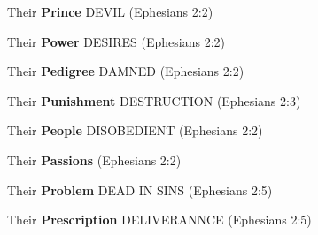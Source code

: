 \begin{compactenum}[I.][8]
    \item Their \textbf{Prince} DEVIL  (Ephesians 2:2)
    \item Their \textbf{Power} DESIRES  (Ephesians 2:2)
    \item Their \textbf{Pedigree} DAMNED (Ephesians 2:2)
    \item Their \textbf{Punishment} DESTRUCTION  (Ephesians 2:3)
    \item Their \textbf{People} DISOBEDIENT (Ephesians 2:2)
    \item Their \textbf{Passions}  (Ephesians 2:2)
    \item Their \textbf{Problem} DEAD IN SINS (Ephesians 2:5)
    \item Their \textbf{Prescription} DELIVERANNCE  (Ephesians 2:5)
\end{compactenum}



